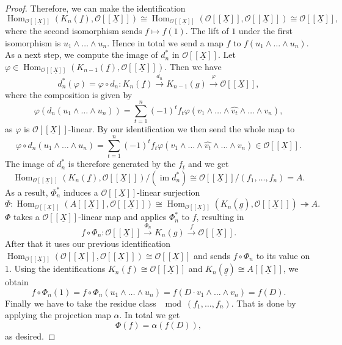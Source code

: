 \documentclass{article}
\theoremstyle{plain}%
\theoremstyle{definition}
\theoremstyle{remark}
\newcommand{\im}{\operatorname{im}}
\renewcommand{\hom}{\operatorname{Hom}}
\begin{document}
\begin{proof}
    Therefore, we can make the identification
    \[
        \hom_{\mathcal{O}[[\underline{X}]]}(K_n(\underline{f}), \mathcal{O}[[\underline{X}]])
        \cong \hom_{\mathcal{O}[[\underline{X}]]}(\mathcal{O}[[\underline{X}]], \mathcal{O}[[\underline{X}]])
        \cong \mathcal{O}[[\underline{X}]],
    \]
    where the second isomorphism sends \(f \mapsto f(1)\). The lift of \(1\) under the first isomorphism is 
    \(u_1\wedge\dots\wedge u_n\). Hence in total we send a map 
    \(f\) to \(f(u_1\wedge\dots\wedge u_n)\).
    As a next step, we compute the image of \(d_n^*\) in \(\mathcal{O}[[\underline{X}]]\).
    Let \(\varphi \in \hom_{\mathcal{O}[[\underline{X}]]}(K_{n-1}(\underline{f}), \mathcal{O}[[\underline{X}]])\).
    Then we have
    \[
        d_n^*(\varphi) = \varphi \circ d_n \colon K_n(\underline{f}) \xrightarrow{d_n} K_{n-1}(g) \xrightarrow{\varphi} 
        \mathcal{O}[[\underline{X}]],  
    \]
    where the composition is given by 
    \[
        \varphi(d_n(u_1 \wedge \dots \wedge u_n)) = \sum_{t=1}^n (-1)^t f_t 
        \varphi(v_1 \wedge \dots \wedge \widehat{v_t} \wedge \dots \wedge v_n), 
    \]
    as \(\varphi\) is \(\mathcal{O}[[\underline{X}]]\)-linear.
    By our identification we then send the whole map to 
    \[
        \varphi \circ d_n(u_1\wedge\dots\wedge u_n) = \sum_{t=1}^n (-1)^t f_t 
        \varphi(v_1 \wedge \dots \wedge \widehat{v_t} \wedge \dots \wedge v_n) \in \mathcal{O}[[\underline{X}]].
    \]
    The image of \(d_n^*\) is therefore generated by the \(f_t\) and we get 
    \[
        \hom_{\mathcal{O}[[\underline{X}]]}(K_n(\underline{f}), \mathcal{O}[[\underline{X}]])/(\im d_n^*) 
        \cong \mathcal{O}[[\underline{X}]]/(f_1, \dots, f_n) = A.
    \]
    As a result, \(\Phi_n^*\) induces a \(\mathcal{O}[[\underline{X}]]\)-linear surjection
    \[
        \Phi\colon \hom_{\mathcal{O}[[\underline{X}]]}(A[[\underline{X}]], \mathcal{O}[[\underline{X}]]) \cong 
        \hom_{\mathcal{O}[[\underline{X}]]}(K_n(\underline{g}), \mathcal{O}[[\underline{X}]]) \twoheadrightarrow A.
    \]
    \(\Phi\) takes a \(\mathcal{O}[[\underline{X}]]\)-linear map and applies \(\Phi_n^*\) to \(f\), resulting in 
    \[
        f \circ \Phi_n\colon \mathcal{O}[[\underline{X}]] \xrightarrow{\Phi_n} K_n(g) 
        \xrightarrow{f} \mathcal{O}[[\underline{X}]].
    \]
    After that it uses our previous identification 
    \(\hom_{\mathcal{O}[[\underline{X}]]}(\mathcal{O}[[\underline{X}]], \mathcal{O}[[\underline{X}]])
    \cong \mathcal{O}[[\underline{X}]]\) 
    and sends \(f \circ \Phi_n\) to its value on \(1\). Using the identifications 
    \(K_n(\underline{f})\cong \mathcal{O}[[\underline{X}]]\) and \(K_n(\underline{g})\cong A[[\underline{X}]]\), we obtain
    \[
        f \circ \Phi_n(1) = f \circ \Phi_n(u_1\wedge\dots\wedge u_n) = f(D\cdot v_1\wedge\dots\wedge v_n) = f(D).
    \]
    Finally we have to take the residue class \(\!\!\!\mod (f_1, \dots, f_n)\). 
    That is done by applying the projection map \(\alpha\). In total we get
    \[
        \Phi(f) = \alpha(f(D)),  
    \]
    as desired.
\end{proof}
\end{document}
